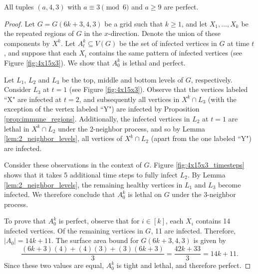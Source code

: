 \begin{con}
\label{con:3x4xa}
All tuples $(a,4,3)$ with $a \equiv 3 \pmod 6$ and $a \geq 9$ are perfect. 
\end{con}

\begin{proof}
Let $G=G(6k+3,4,3)$ be a grid such that $k \geq 1$, and let $X_1, \dots, X_{k}$ be the repeated regions of $G$ in the $x$-direction. Denote the union of these components by $X^k$. Let $A_t^k \subseteq V(G)$ be the set of infected vertices in $G$ at time $t$, and suppose that each $X_i$ contains the same pattern of infected vertices (see Figure \ref{fig:4x15x3}). We show that $A_0^k$ is lethal and perfect. 

Let $L_1$, $L_2$ and $L_3$ be the top, middle and bottom levels of $G$, respectively. Consider $L_3$ at $t=1$ (see Figure \ref{fig:4x15x3}). Observe that the vertices labeled ``X" are infected at $t=2$, and subsequently all vertices in $X^k \cap L_3$ (with the exception of the vertex labeled ``Y") are infected by Proposition \ref{prop:immune_regions}. Additionally, the infected vertices in $L_2$ at $t=1$ are lethal in $X^k \cap L_2$ under the 2-neighbor process, and so by Lemma \ref{lem:2_neighbor_levels}, all vertices of $X^k \cap L_2$ (apart from the one labeled ``Y") are infected.

Consider these observations in the context of $G$. Figure \ref{fig:4x15x3_timesteps} shows that it takes 5 additional time steps to fully infect $L_2$. By Lemma \ref{lem:2_neighbor_levels}, the remaining healthy vertices in $L_1$ and $L_3$ become infected. We therefore conclude that $A_0^k$ is lethal on $G$ under the 3-neighbor process.

To prove that $A_0^k$ is perfect, observe that for $i \in [k]$, each $X_i$ contains 14 infected vertices. Of the remaining vertices in $G$, 11 are infected. Therefore, $|A_0| = 14k+11$. The surface area bound for $G(6k+3,4,3)$ is given by
$$\frac{(6k+3)(4) + (4)(3) + (3)(6k+3)}{3} = \frac{42k + 33}{3} = 14k+11.$$
Since these two values are equal, $A_0^k$ is tight and lethal, and therefore perfect.
\end{proof}


